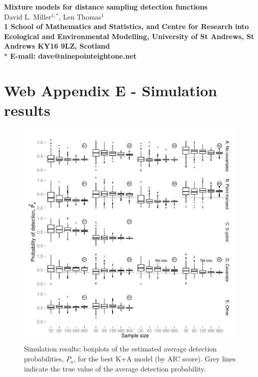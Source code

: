 \documentclass[10pt]{article}
\date{}
\begin{document}
\begin{flushleft}
{\Large
\textbf{Mixture models for distance sampling detection functions}
}
\\
David L. Miller$^{1,\ast}$,
Len Thomas$^{1}$
\\
\bf{1} School of Mathematics and Statistics, and Centre for Research into Ecological and Environmental Modelling, University of St Andrews, St Andrews KY16 9LZ, Scotland
\\
$\ast$ E-mail: dave@ninepointeightone.net
\end{flushleft}


\section*{Web Appendix E - Simulation results}

\begin{figure}[H]
\centering
\includegraphics[width=\textwidth]{simulations/pa-plot-cds.pdf}
\caption{Simulation results: boxplots of the estimated average detection probabilities, $P_a$, for the best K+A model (by AIC score). Grey lines indicate the true value of the average detection probability.}
\label{sim-boxplots-cds}
\end{figure}
\end{document}

